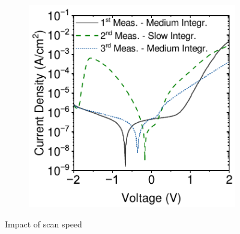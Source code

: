 \begin{figure}[htbp]
    \centering
    \begin{subfigure}[t]{0.5\textwidth}
        \centering
        \includegraphics[width=\textwidth]{chapters/transport_layers/images/JV_TiO12_Scan_Speed.pdf} %
                
    \end{subfigure}

    \caption{Impact of scan speed}
    \label{fig:tio2:scan_speed}
\end{figure}


